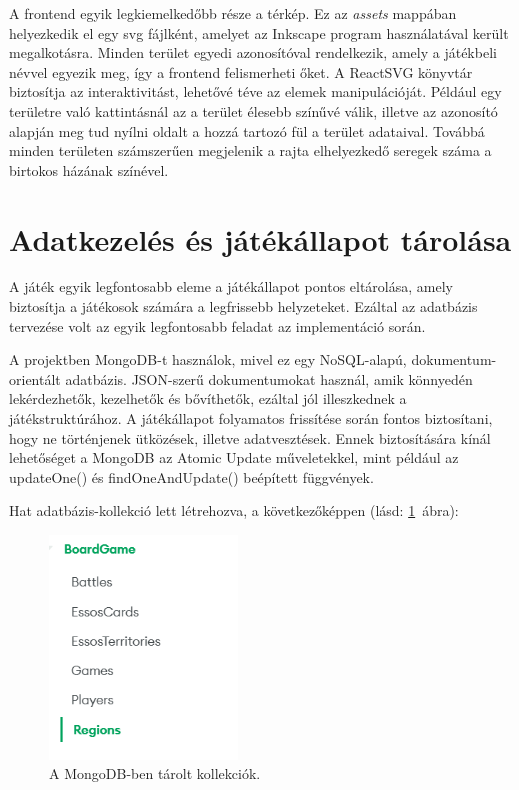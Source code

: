 \documentclass[
]{thesis-ekf}
\theoremstyle{definition}
\theoremstyle{remark}
\begin{document}
A frontend egyik legkiemelkedőbb része a térkép. Ez az \emph{assets} mappában helyezkedik el egy svg fájlként, amelyet az Inkscape program használatával került megalkotásra. Minden terület egyedi azonosítóval rendelkezik, amely a játékbeli névvel egyezik meg, így a frontend felismerheti őket. A ReactSVG könyvtár biztosítja az interaktivitást, lehetővé téve az elemek manipulációját. Például egy területre való kattintásnál az a terület élesebb színűvé válik, illetve az azonosító alapján meg tud nyílni oldalt a hozzá tartozó fül a terület adataival. Továbbá minden területen számszerűen megjelenik a rajta elhelyezkedő seregek száma a birtokos házának színével. 


\section{Adatkezelés és játékállapot tárolása}

A játék egyik legfontosabb eleme a játékállapot pontos eltárolása, amely biztosítja a játékosok számára a legfrissebb helyzeteket. Ezáltal az adatbázis tervezése volt az egyik legfontosabb feladat az implementáció során. 

A projektben MongoDB-t használok, mivel ez egy NoSQL-alapú, dokumentum-orientált adatbázis. JSON-szerű dokumentumokat használ, amik könnyedén lekérdezhetők, kezelhetők és bővíthetők, ezáltal jól illeszkednek a játékstruktúrához. \cite{MongoDB} A játékállapot folyamatos frissítése során fontos biztosítani, hogy ne történjenek ütközések, illetve adatvesztések. Ennek biztosítására kínál lehetőséget a MongoDB az Atomic Update műveletekkel, mint például az updateOne() és findOneAndUpdate() beépített függvények.



Hat adatbázis-kollekció lett létrehozva, a következőképpen (lásd: \ref{collections}~ábra):

\begin{figure}[ht!]
	\centering
	\includegraphics[width=5cm]{Collections.png}
	\caption{A MongoDB-ben tárolt kollekciók.}
	\label{collections}
\end{figure}
\end{document}
